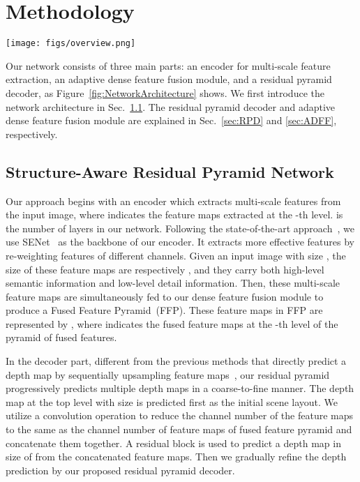 \documentclass{article}
\begin{document}
 	\section{Methodology}
\label{sec:method}

\begin{figure*}[ht]
	\centering 
	\texttt{[image: figs/overview.png]}
	\caption{The network architecture. Our Structure-Aware Residual Pyramid Network consists of an encoder which extracts multi-scale visual features, a Residual Pyramid Decoder (RPD) which progressively infers depth maps in a coarse-to-fine manner, and an Adaptive Dense Feature Fusion (ADFF) module for dense feature fusion. The residual pyramid effectively adds structure details in each level based on the scene layout predicted at a coarser level. }
	\label{fig:NetworkArchitecture}
\end{figure*}

Our network consists of three main parts: an encoder for multi-scale feature extraction, an adaptive dense feature fusion module, and a residual pyramid decoder, as Figure~\ref{fig:NetworkArchitecture} shows.
We first introduce the network architecture in Sec.~\ref{sec:network}. The residual pyramid decoder and adaptive dense feature fusion module are explained in Sec.~\ref{sec:RPD} and \ref{sec:ADFF}, respectively. 

\subsection{Structure-Aware Residual Pyramid Network}
\label{sec:network}

Our approach begins with an encoder which extracts multi-scale features  from the input image, where  indicates the feature maps extracted at the -th level.  is the number of layers in our network. Following the state-of-the-art approach~\cite{hu2019revisiting}, we use SENet~\cite{hu2018squeeze} as the backbone of our encoder. It extracts more effective features by re-weighting features of different channels. Given an input image with size , the size of these feature maps are respectively , and they carry both high-level semantic information and low-level detail information. 
Then, these multi-scale feature maps are simultaneously fed to our dense feature fusion module to produce a Fused Feature Pyramid~(FFP). 
These feature maps in FFP are represented by , where  indicates the fused feature maps at the -{th} level of the pyramid of fused features. 

In the decoder part, different from the previous methods that directly predict a depth map by sequentially upsampling feature maps~\cite{laina2016deeper,hu2019revisiting}, our residual pyramid progressively predicts multiple depth maps in a coarse-to-fine manner. 
The depth map at the top level with size  is predicted first as the initial scene layout. 
We utilize a  convolution operation to reduce the channel number of the feature maps  to the same as the channel number of feature maps  of fused feature pyramid and concatenate them together. 
A residual block is used to predict a depth map  in size of  from the concatenated feature maps. 
Then we gradually refine the depth prediction by our proposed residual pyramid decoder.
 
\end{document}
